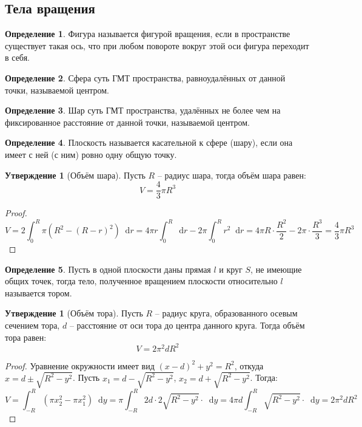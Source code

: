 \documentclass[12pt]{article}
\theoremstyle{definition}
\newtheorem{definition}{Определение}
\newtheorem{statement}[theorem]{Утверждение}
\newcommand*\diff{\mathop{}\!\mathrm{d}}
\begin{document}
\subsection{Тела вращения}

\begin{definition}
  Фигура называется фигурой вращения, если в пространстве существует такая ось, что при любом повороте вокруг этой оси фигура переходит в себя.
\end{definition}
\begin{definition}
  Сфера суть ГМТ пространства, равноудалённых от данной точки, называемой центром.
\end{definition}
\begin{definition}
  Шар суть ГМТ пространства, удалённых не более чем на фиксированное расстояние от данной точки, называемой центром.
\end{definition}
\begin{definition}
  Плоскость называется касательной к сфере (шару), если она имеет с ней (с ним) ровно одну общую точку.
\end{definition}
\begin{statement}[Объём шара]
  Пусть $R$ – радиус шара, тогда объём шара равен:
  $$V=\frac{4}{3}\pi R^3$$
\end{statement}
\begin{proof}
  $$V=2\int_{0}^{R}\pi\left(R^2-(R-r)^2\right)\diff r=4\pi r\int_{0}^{R}\diff r-2\pi\int_{0}^{R}r^2\diff r=4\pi R\cdot \frac{R^2}{2} - 2\pi\cdot \frac{R^3}{3}=\frac{4}{3}\pi R^3$$
\end{proof}
\begin{definition}
  Пусть в одной плоскости даны прямая $l$ и круг $S$, не имеющие общих точек, тогда тело, полученное вращением плоскости относительно $l$ называется тором.
\end{definition}
\begin{statement}[Объём тора]
  Пусть $R$ – радиус круга, образованного осевым сечением тора, $d$ – расстояние от оси тора до центра данного круга. Тогда объём тора равен:
  $$V=2\pi^2 d R^2$$
\end{statement}
\begin{proof}
  Уравнение окружности имеет вид $(x-d)^2 + y^2=R^2$, откуда $x=d\pm \sqrt{R^2-y^2}$. Пусть $x_1=d-\sqrt{R^2-y^2}$, $x_2=d+\sqrt{R^2-y^2}$. Тогда:
  $$V=\int_{-R}^{R}(\pi x_2^2-\pi x_1^2)\diff y=\pi\int_{-R}^{R}2d\cdot2\sqrt{R^2-y^2}\cdot \diff y=4\pi d\int_{-R}^{R}\sqrt{R^2-y^2}\cdot \diff y=2\pi^2 d R^2$$
\end{proof}
\end{document}
